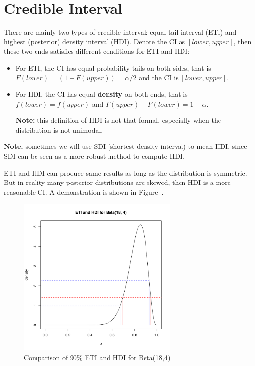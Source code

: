 \documentclass[a4paper,12pt]{article}
\begin{document}
\section{Credible Interval}
\label{sec:credible-interval}

There are mainly two types of credible interval: equal tail interval (ETI) and highest (posterior) density interval (HDI). Denote the CI as $[lower, upper]$, then these two ends satisfies different conditions for ETI and HDI:
\begin{itemize}
\item For ETI, the CI has equal probability tails on both sides, that is $F\left(lower\right) = (1 - F(upper)) = \alpha / 2$ and the CI is $[lower, upper]$.
\item For HDI, the CI has equal \textbf{density} on both ends, that is $f\left(lower\right) = f\left(upper\right)$ and $F\left(upper\right) - F\left(lower\right) = 1 - \alpha$.
  
  \textbf{Note:} this definition of HDI is not that formal, especially when the distribution is not unimodal.
\end{itemize}
\textbf{Note:} sometimes we will use SDI (shortest density interval) to mean HDI, since SDI can be seen as a more robust method to compute HDI\citep{Liu2015p809-819}.
\par
ETI and HDI can produce same results as long as the distribution is symmetric. But in reality many posterior distributions are skewed, then HDI is a more reasonable CI. A demonstration is shown in Figure~.
\begin{figure}[htbp]
  \centering
  \includegraphics[width = 0.7\textwidth]{figs/eti_and_hdi}
  \caption{Comparison of 90\% ETI and HDI for Beta(18,4)}
  \label{fig:eti_and_hdi}
\end{figure}
\end{document}
